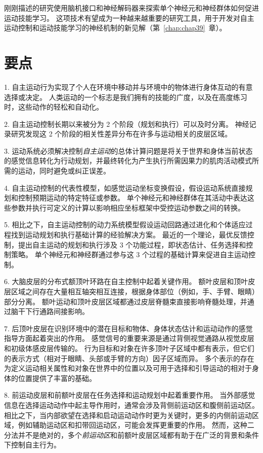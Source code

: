 刚刚描述的研究使用脑机接口和神经解码器来探索单个神经元和神经群体如何促进运动技能学习。
这项技术有望成为一种越来越重要的研究工具，用于开发对自主运动控制和运动技能学习的神经机制的新见解（第~\ref{chap:chap39}~章）。



\section{要点}

1. 自主运动行为实现了个人在环境中移动并与环境中的物体进行身体互动的有意选择或决定。
人类运动的一个标志是我们拥有的技能的广度，以及在高度练习时，这些动作的轻松和自动化。


2. 自主运动控制长期以来被分为 2 个阶段（规划和执行）可以及时分离。
神经记录研究发现这 2 个阶段的相关性差异分布在许多与运动相关的皮层区域。


3. 运动系统必须解决控制\textit{自主运动}的总体计算问题是将关于世界和身体当前状态的感觉信息转化为行动规划，并最终转化为产生执行所需因果力的肌肉活动模式所需的运动，同时避免或纠正误差。


4. 自主运动控制的代表性模型，如感觉运动坐标变换假设，假设运动系统直接规划和控制预期运动的特定特征或参数。
单个神经元和神经群体在其活动中表达这些参数并执行可定义的计算以影响相应坐标框架中受控运动参数之间的转换。


5. 相比之下，自主运动控制的动力系统模型假设运动回路通过进化和个体适应过程找到运动规划和执行基础计算的经验解决方案。
最近的一个理论，最优反馈控制，提出自主运动的规划和执行涉及 3 个功能过程，即状态估计、任务选择和控制策略。
单个神经元和神经群通过参与这 3 个过程的基础计算来促进自主运动控制。


6. 大脑皮层的分布式额顶叶环路在自主控制中起着关键作用。
额叶皮层和顶叶皮层区域之间存在大量相互轴突相互连接，根据身体部位（例如，手、手臂、眼睛）部分分离。
额叶运动和顶叶皮层区域都通过皮层脊髓束直接影响脊髓处理，并通过脑干下行通路间接影响。


7. 后顶叶皮层在识别环境中的潜在目标和物体、身体状态估计和运动动作的感觉指导方面起着突出的作用。
感觉信号的重要来源是通过背侧视觉通路从视觉皮层和初级体感皮层传输的。
行为目标和对象在许多顶叶子区域中都有表示，但它们的表示方式（相对于眼睛、头部或手臂的方向）因子区域而异。
多个表示的存在为定义运动相关属性和对象在世界中的位置以及可用于选择和引导运动的相对于身体的位置提供了丰富的基础。


8. 前运动皮层和前额叶皮层在任务选择和运动规划中起着重要作用。
当外部感觉信息在选择运动动作中起主导作用时，通常会涉及背侧前运动区和腹侧前运动区。
相比之下，当内部欲望在选择和启动运动动作时更为关键时，更多的内侧前运动区域，例如辅助运动区和扣带回运动区，可能会发挥更重要的作用。
然而，这种二分法并不是绝对的，多个\textit{前运动区}和前额叶皮层区域都有助于在广泛的背景和条件下控制自主行为。


